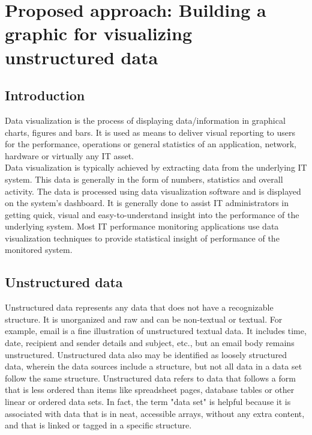 \chapter{Proposed approach: Building a graphic for visualizing unstructured data}
\label{chap_dev}
	
\section*{Introduction}

Data visualization is the process of displaying data/information in graphical charts, figures and bars. It is used as means to deliver visual reporting to users for the performance, operations or general statistics of an application, network, hardware or virtually any IT asset. \\

Data visualization is typically achieved by extracting data from the underlying IT system. This data is generally in the form of numbers, statistics and overall activity. The data is processed using data visualization software and is displayed on the system's dashboard. It is generally done to assist IT administrators in getting quick, visual and easy-to-understand insight into the performance of the underlying system. Most IT performance monitoring applications use data visualization techniques to provide statistical insight of performance of the monitored system.
\newpage




\section{Unstructured data}
Unstructured data represents any data that does not have a recognizable structure. It is unorganized and raw and can be non-textual or textual. For example, email is a fine illustration of unstructured textual data. It includes time, date, recipient and sender details and subject, etc., but an email body remains unstructured. Unstructured data also may be identified as loosely structured data, wherein the data sources include a structure, but not all data in a data set follow the same structure.
Unstructured data refers to data that follows a form that is less ordered than items like spreadsheet pages, database tables or other linear or ordered data sets. In fact, the term "data set" is helpful because it is associated with data that is in neat, accessible arrays, without any extra content, and that is linked or tagged in a specific structure. \\

